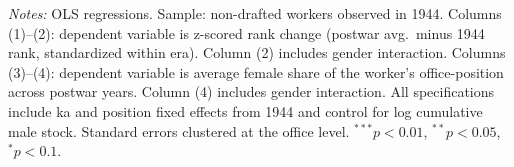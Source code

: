 \begin{table}[htbp]
\begin{threeparttable}
\begin{tablenotes}[flushleft]
\item \textit{Notes:} OLS regressions. Sample: non-drafted workers observed in 1944. Columns (1)--(2): dependent variable is z-scored rank change (postwar avg.\ minus 1944 rank, standardized within era). Column (2) includes gender interaction. Columns (3)--(4): dependent variable is average female share of the worker's office-position across postwar years. Column (4) includes gender interaction. All specifications include ka and position fixed effects from 1944 and control for log cumulative male stock. Standard errors clustered at the office level. $^{***}p<0.01$, $^{**}p<0.05$, $^{*}p<0.1$.
\end{tablenotes}
\end{threeparttable}
\end{table}
